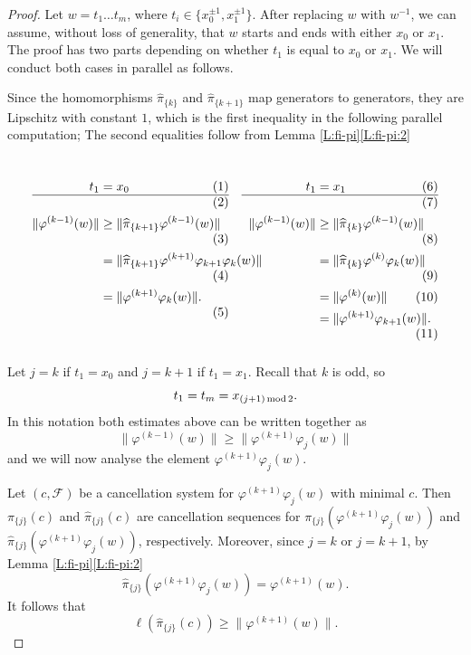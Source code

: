 \documentclass[12pt,reqno,a4paper]{article}
\theoremstyle{definition}
\theoremstyle{remark}
\numberwithin{equation}{section}
\numberwithin{figure}{section}
\newcommand{\C}[1]{{\mathscr #1}}
\begin{document}
\begin{proof}
Let $w=t_1\dots t_m$, where $t_i\in \{x_0^{\pm 1},x_1^{\pm 1}\}$. 
After replacing $w$ with
$w^{-1}$, we can assume, without loss of generality, that $w$ starts and ends 
with either $x_0$ or $x_1$. The proof has
two parts depending on whether $t_1$ is equal to $x_0$ or $x_1$. 
We will conduct both cases in parallel as follows.

Since the homomorphisms
$\widehat{\pi}_{\{k\}}$ and $\widehat{\pi}_{\{k+1\}}$ 
map generators to generators, they are Lipschitz with
constant $1$, which is the first inequality in the following
parallel computation; The second equalities follow from Lemma \ref{L:fi-pi}\ref{L:fi-pi:2}
$$
\begin{array}{cc}
\parbox[t]{0.45 \textwidth}{
\begin{align*}
t_1 &=x_0\\
\hline\\
\|\varphi^{(k-1)}(w)\|
&\geq \|\widehat{\pi}_{\{k+1\}}\varphi^{(k-1)}(w)\|\\
&=\|\widehat{\pi}_{\{k+1\}}\varphi^{(k+1)}\varphi_{k+1}\varphi_k(w)\|\\
&=\|\varphi^{(k+1)}\varphi_k(w)\|.
\end{align*}
}&
\parbox[t]{0.45 \textwidth}{
\begin{align*}
t_1 &= x_1\\
\hline\\
\|\varphi^{(k-1)}(w)\|
&\geq \|\widehat{\pi}_{\{k\}}\varphi^{(k-1)}(w)\|\\
&=\|\widehat{\pi}_{\{k\}}\varphi^{(k)}\varphi_k(w)\|\\
&=\|\varphi^{(k)}(w)\|\\
&=\|\varphi^{(k+1)}\varphi_{k+1}(w)\|.
\end{align*}
}
\end{array}
$$
Let $j = k$ if $t_1=x_0$ and $j = k+1$ if $t_1=x_1$.
Recall that $k$ is odd, so 
\[
t_1 = t_m=x_{(j+1)\,{\rm mod}\,2}.
\]
In this notation both estimates above can be written together as
\begin{equation}
\|\varphi^{(k-1)}(w)\|\geq \|\varphi^{(k+1)}\varphi_{j}(w)\|
\label{Eq:j-notation}
\end{equation}
and we will now analyse the element $\varphi^{(k+1)}\varphi_{j}(w)$.

Let $(c,\C F)$ be a cancellation system for
$\varphi^{(k+1)}\varphi_{j}(w)$ 
with minimal $c$.
Then $\pi_{\{j\}}(c)$ and $\widehat{\pi}_{\{j\}}(c)$ are cancellation 
sequences for
$\pi_{\{j\}}(\varphi^{(k+1)}\varphi_{j}(w))$ and 
$\widehat{\pi}_{\{j\}}(\varphi^{(k+1)}\varphi_{j}(w))$, respectively.
Moreover, since $j=k$ or $j=k+1$, by Lemma \ref{L:fi-pi}\ref{L:fi-pi:2}
$$
\widehat{\pi}_{\{j\}}(\varphi^{(k+1)}\varphi_{j}(w)) 
=\varphi^{(k+1)}(w).
$$
It follows that
\[
\ell(\widehat{\pi}_{\{j\}}(c))\geq \|\varphi^{(k+1)}(w)\|.
\]
%
%

\end{proof}
\end{document}

